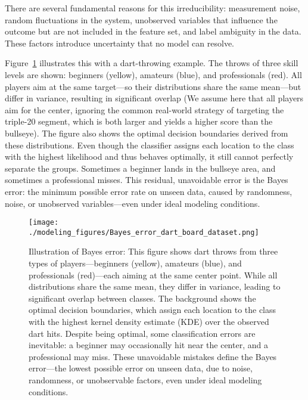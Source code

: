 \documentclass[12pt,openany, draft]{book}
\begin{document}
There are several fundamental reasons for this irreducibility: measurement noise, random fluctuations in the system, unobserved variables that influence the outcome but are not included in the feature set, and label ambiguity in the data. These factors introduce uncertainty that no model can resolve. \newline

Figure~\ref{fig:bayes-error-darts} illustrates this with a dart-throwing example. The throws of three skill levels are shown: beginners (yellow), amateurs (blue), and professionals (red). All players aim at the same target—so their distributions share the same mean—but differ in variance, resulting in significant overlap (We assume here that all players aim for the center, ignoring the common real-world strategy of targeting the triple-20 segment, which is both larger and yields a higher score than the bullseye). The figure also shows the optimal decision boundaries derived from these distributions. Even though the classifier assigns each location to the class with the highest likelihood and thus behaves optimally, it still cannot perfectly separate the groups. Sometimes a beginner lands in the bullseye area, and sometimes a professional misses. This residual, unavoidable error is the Bayes error: the minimum possible error rate on unseen data, caused by randomness, noise, or unobserved variables—even under ideal modeling conditions.

\begin{figure}[H]
    \centering
    \texttt{[image: ./modeling\_figures/Bayes\_error\_dart\_board\_dataset.png]}
    \caption{
    Illustration of Bayes error: This figure shows dart throws from three types of players—beginners (yellow), amateurs (blue), and professionals (red)—each aiming at the same center point. While all distributions share the same mean, they differ in variance, leading to significant overlap between classes. The background shows the optimal decision boundaries, which assign each location to the class with the highest kernel density estimate (KDE) over the observed dart hits. Despite being optimal, some classification errors are inevitable: a beginner may occasionally hit near the center, and a professional may miss. These unavoidable mistakes define the Bayes error—the lowest possible error on unseen data, due to noise, randomness, or unobservable factors, even under ideal modeling conditions.
    }
    \label{fig:bayes-error-darts}
\end{figure}
\end{document}
